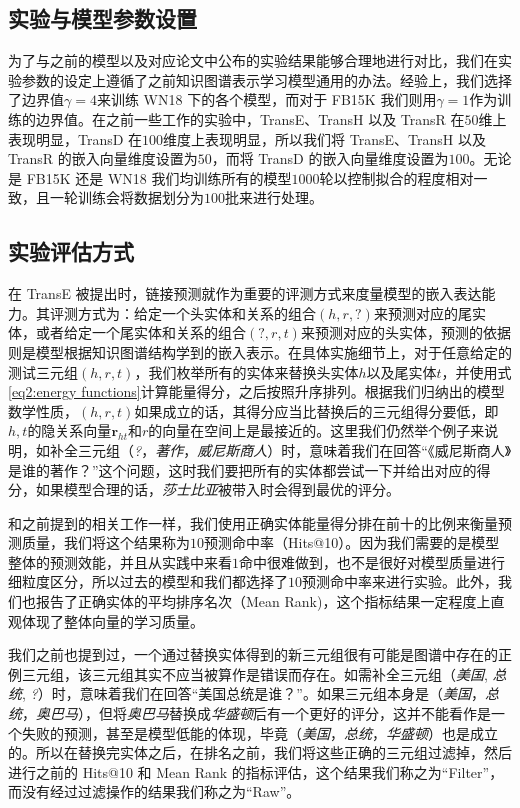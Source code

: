 \subsection{实验与模型参数设置}
为了与之前的模型以及对应论文中公布的实验结果能够合理地进行对比，我们在实验参数的设定上遵循了之前知识图谱表示学习模型通用的办法。经验上，我们选择了边界值$\gamma = 4$来训练 WN18 下的各个模型，而对于 FB15K 我们则用$\gamma = 1$作为训练的边界值。在之前一些工作的实验中，TransE、TransH 以及 TransR 在$50$维上表现明显，TransD 在$100$维度上表现明显，所以我们将 TransE、TransH 以及 TransR 的嵌入向量维度设置为$50$，而将 TransD 的嵌入向量维度设置为$100$。无论是 FB15K 还是 WN18 我们均训练所有的模型$1000$轮以控制拟合的程度相对一致，且一轮训练会将数据划分为$100$批来进行处理。


\subsection{实验评估方式}
在 TransE \cite{bordes2013translating} 被提出时，链接预测就作为重要的评测方式来度量模型的嵌入表达能力。其评测方式为：给定一个头实体和关系的组合$(h, r, ?)$来预测对应的尾实体，或者给定一个尾实体和关系的组合$(?, r ,t)$来预测对应的头实体，预测的依据则是模型根据知识图谱结构学到的嵌入表示。在具体实施细节上，对于任意给定的测试三元组$(h, r, t)$，我们枚举所有的实体来替换头实体$h$以及尾实体$t$，并使用式\ref{eq2:energy functions}计算能量得分，之后按照升序排列。根据我们归纳出的模型数学性质，$(h, r, t)$如果成立的话，其得分应当比替换后的三元组得分要低，即$h, t$的隐关系向量$\textbf{r}_{ht}$和$r$的向量在空间上是最接近的。这里我们仍然举个例子来说明，如补全三元组（\emph{?}，\emph{著作}，\emph{威尼斯商人}）时，意味着我们在回答``《威尼斯商人》是谁的著作？''这个问题，这时我们要把所有的实体都尝试一下并给出对应的得分，如果模型合理的话，\emph{莎士比亚}被带入时会得到最优的评分。

和之前提到的相关工作一样，我们使用正确实体能量得分排在前十的比例来衡量预测质量，我们将这个结果称为$10$预测命中率（Hits@10）。因为我们需要的是模型整体的预测效能，并且从实践中来看$1$命中很难做到，也不是很好对模型质量进行细粒度区分，所以过去的模型和我们都选择了$10$预测命中率来进行实验。此外，我们也报告了正确实体的平均排序名次（Mean Rank)，这个指标结果一定程度上直观体现了整体向量的学习质量。

我们之前也提到过，一个通过替换实体得到的新三元组很有可能是图谱中存在的正例三元组，该三元组其实不应当被算作是错误而存在。如需补全三元组（\emph{美国}, \emph{总统}, \emph{?}）时，意味着我们在回答``美国总统是谁？''。如果三元组本身是（\emph{美国}，\emph{总统}，\emph{奥巴马}），但将\emph{奥巴马}替换成\emph{华盛顿}后有一个更好的评分，这并不能看作是一个失败的预测，甚至是模型低能的体现，毕竟（\emph{美国}，\emph{总统}，\emph{华盛顿}）也是成立的。所以在替换完实体之后，在排名之前，我们将这些正确的三元组过滤掉，然后进行之前的 Hits@10 和 Mean Rank 的指标评估，这个结果我们称之为``Filter''，而没有经过过滤操作的结果我们称之为``Raw''。

